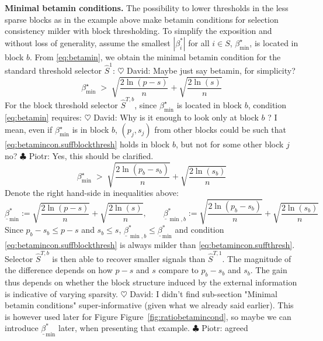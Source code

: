 \documentclass[aos]{imsart}
\theoremstyle{plain}
\newcommand{\david}[1]{{\small{\color{blue} \sf $\heartsuit$ David: #1}}}
\newcommand{\piotr}[1]{{\small{\color{red} \sf $\clubsuit$ Piotr: #1}}}
\begin{document}
\noindent\textbf{Minimal betamin conditions.} The possibility to lower thresholds in the less sparse blocks as in the example above make betamin conditions for selection consistency milder with block thresholding. To simplify the exposition and without loss of generality, assume the smallest $|\beta_i^*|$ for all $i\in S$, $\beta_{\min}^{\star}$, is located in block $b$. 
From \eqref{eq:betamin}, we obtain the minimal betamin condition for the standard threshold selector $\hat{S}^{1}$:
\david{Maybe just say betamin, for simplicity?}
\begin{equation}\label{eq:betamincon.suffthresh}
    \beta_{\min}^{\star} \;>\; \sqrt{\frac{2\ln(p-s)}{n}}+\sqrt{\frac{2\ln(s)}{n}}
\end{equation} 
For the block threshold selector $\hat{S}^{T,b}$, since $\beta_{\min}^{\star}$ is located in block $b$, condition \eqref{eq:betamin} requires:
\david{Why is it enough to look only at block $b$ ? I mean, even if $\beta_{\min}^\star$ is in block $b$, $(p_j,s_j)$ from other blocks could be such that \eqref{eq:betamincon.suffblockthresh} holds in block $b$, but not for some other block $j$ no?}\piotr{Yes, this should be clarified.}
\begin{equation}\label{eq:betamincon.suffblockthresh}
    \beta_{\min}^{\star} \;>\; \sqrt{\frac{2\ln(p_b-s_b)}{n}}+\sqrt{\frac{2\ln(s_b)}{n}}
\end{equation} 
Denote the right hand-side in inequalities above: 
\begin{equation}\label{eq:betaminbardef}
    \underline{\beta}_{\min}^{*} := \sqrt{\frac{2\ln(p-s)}{n}} + \sqrt{\frac{2\ln(s)}{n}},\qquad
    \underline{\beta}^{*}_{\min,b} := \sqrt{\frac{2\ln(p_b-s_b)}{n}} + \sqrt{\frac{2\ln(s_b)}{n}}
\end{equation} Since $p_b-s_b \leq p - s$ and $s_b \leq s$, $\underline{\beta}^{*}_{\min,b} \leq \underline{\beta}_{\min}^{*}$ and condition \eqref{eq:betamincon.suffblockthresh} is always milder than \eqref{eq:betamincon.suffthresh}. Selector $\hat{S}^{T,b}$ is then able to recover smaller signals than $\hat{S}^{T,1}$. The magnitude of the difference depends on how $p-s$ and $s$ compare to $p_b-s_b$ and $s_b$. The gain thus depends on whether the block structure induced by the external information is indicative of varying sparsity. \david{I didn't find sub-section "Minimal betamin conditions" super-informative (given what we already said earlier). This is however used later for Figure Figure~\ref{fig:ratiobetamincond}, so maybe we can introduce $\underline{\beta}_{\min}^{*}$ later, when presenting that example.}\piotr{agreed}
\end{document}
